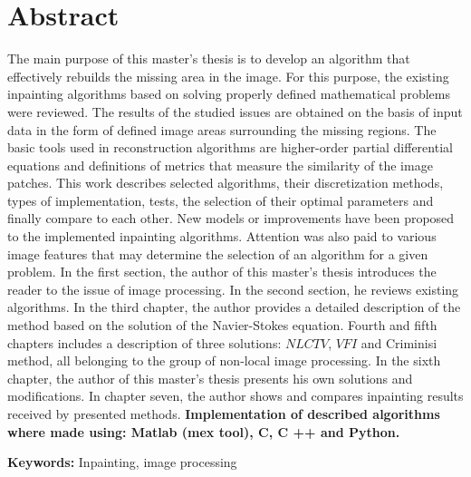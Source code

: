 \section*{Abstract}
The main purpose of this master's thesis is to develop an algorithm that effectively rebuilds the missing area in the image. For this purpose, the existing inpainting algorithms based on solving properly defined mathematical problems were reviewed. The results of the studied issues are obtained on the basis of input data in the form of defined image areas surrounding the missing regions. The basic tools used in reconstruction algorithms are higher-order partial differential equations and definitions of metrics that measure the similarity of the image patches. This work describes selected algorithms, their discretization methods, types of implementation, tests, the selection of their optimal parameters and finally compare to each other. New models or improvements have been proposed to the implemented inpainting algorithms. Attention was also paid to various image features that may determine the selection of an algorithm for a given problem. In the first section, the author of this master's thesis introduces the reader to the issue of image processing. In the second section, he reviews existing algorithms. In the third chapter, the author provides a detailed description of the method based on the solution of the Navier-Stokes equation. Fourth and fifth chapters includes a description of three solutions: $NLCTV$, $VFI$ and Criminisi method, all belonging to the group of non-local image processing. In the sixth chapter, the author of this master's thesis presents his own solutions and modifications. In chapter seven, the author shows and compares inpainting results received by presented methods. \textbf {Implementation of described algorithms where made using: Matlab (mex tool), C, C ++ and Python.}

\bigskip
{\noindent \bf Keywords:} Inpainting, image processing

\vfill